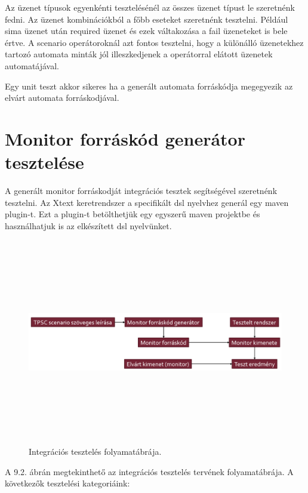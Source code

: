Az üzenet típusok egyenkénti tesztelésénél az összes üzenet típust le szeretnénk fedni.
Az üzenet kombinációkból a főbb eseteket szeretnénk tesztelni.
Például sima üzenet után required üzenet és ezek váltakozása a fail üzeneteket is bele értve.
A scenario operátoroknál azt fontos tesztelni, hogy a különálló üzenetekhez tartozó automata minták jól illeszkedjenek a operátorral elátott üzenetek automatájával.

Egy unit teszt akkor sikeres ha a generált automata forráskódja megegyezik az elvárt automata forráskodjával.

\clearpage\section{Monitor forráskód generátor tesztelése }

A generált monitor forráskodját integrációs tesztek segítségével szeretnénk tesztelni.
Az Xtext keretrendszer a specifikált dsl nyelvhez generál egy maven plugin-t.
Ezt a plugin-t betölthetjük egy egyszerű maven projektbe és használhatjuk is az elkészített dsl nyelvünket.

\begin{figure}[!ht]
    \centering
    \includegraphics[width=150mm, height=9cm, keepaspectratio]{figures/integration_test_flow.png}
    \caption{Integrációs tesztelés folyamatábrája.}
\end{figure}

A 9.2. ábrán megtekinthető az integrációs tesztelés tervének folyamatábrája.
A következők tesztelési kategoriáink:

